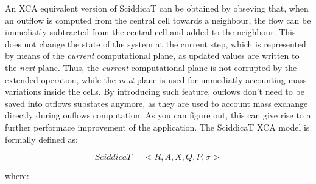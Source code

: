 An XCA equivalent version of SciddicaT can be obtained by obseving
that, when an outflow is computed from the central cell towards a
neighbour, the flow can be immediatly subtracted from the central cell
and added to the neighbour. This does not change the state of the
system at the current step, which is represented by means of the
\emph{current} computational plane, as updated values are written to
the \emph{next} plane. Thus, the \emph{current} computational plane is
not corrupted by the extended operation, while the \emph{next} plane
is used for immediatly accounting mass variations inside the cells. By
introducing such feature, ouflows don't need to be saved into otflows
substates anymore, as they are used to account mass exchange directly
during ouflows computation. As you can figure out, this can give rise
to a further performace improvement of the application. The SciddicaT
XCA model is formally defined as:


$$SciddicaT = < R, A, X, Q , P, \sigma  >$$

where:

